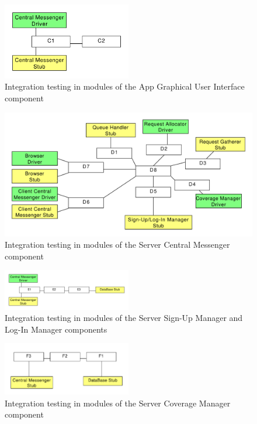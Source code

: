 \begin{figure}
\centering
\includegraphics[width=0.5\textwidth]{tex-images/mod-3}
\caption{Integration testing in modules of the App Graphical User Interface component}
\end{figure}

\begin{figure}
\centering
\includegraphics[width=\textwidth]{tex-images/mod-4}
\caption{Integration testing in modules of the Server Central Messenger component}
\end{figure}

\begin{figure}
\centering
\includegraphics[width=0.5\textwidth]{tex-images/mod-5}
\caption{Integration testing in modules of the Server Sign-Up Manager and Log-In Manager components}
\end{figure}

\begin{figure}
\centering
\includegraphics[width=0.5\textwidth]{tex-images/mod-6}
\caption{Integration testing in modules of the Server Coverage Manager component}
\end{figure}


